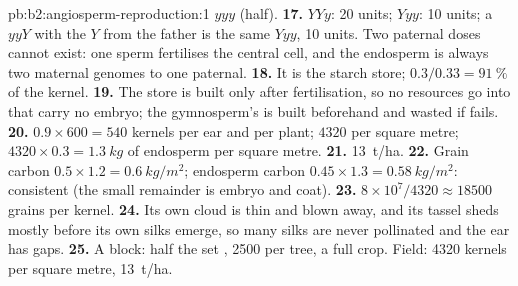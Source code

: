 \begin{solution}{pb:b2:angiosperm-reproduction:1}
$yyy$ (half).
\textbf{17.} $YYy$: 20 units; $Yyy$: 10 units; a $yyY$ with the $Y$
from the father is the same  $Yyy$, 10 units. Two paternal
doses cannot exist: one sperm fertilises the central cell, and the
endosperm is always two maternal genomes to one paternal.
\textbf{18.} It is the starch store; $0.3/0.33 = \qty{91}{\%}$ of the
kernel.
\textbf{19.} The store is built only after fertilisation, so no
resources go into  that carry no embryo; the gymnosperm's
 is built beforehand and wasted if  fails.
\textbf{20.} $0.9\times 600 = 540$ kernels per ear and per plant;
$4320$ per square metre; $4320\times 0.3 = \qty{1.3}{kg}$ of endosperm
per square metre.
\textbf{21.} \qty{13}{t/ha}.
\textbf{22.} Grain carbon $0.5\times 1.2 = \qty{0.6}{kg/m^2}$;
endosperm carbon $0.45\times 1.3 = \qty{0.58}{kg/m^2}$: consistent
(the small remainder is embryo and coat).
\textbf{23.} $8\times 10^{7}/4320 \approx \num{18500}$ grains per
kernel.
\textbf{24.} Its own  cloud is thin and blown away, and its
tassel sheds mostly before its own silks emerge, so many silks are
never pollinated and the ear has gaps.
\textbf{25.} A block: half the  set , 2500 per tree, a
full crop. Field: 4320 kernels per square metre, \qty{13}{t/ha}.
\end{solution}
